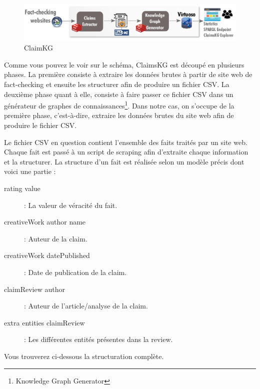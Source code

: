 \documentclass[oneside,13pt,a4paper]{report}
\begin{document}
\begin{figure}[h]
	\centering
	\begin{minipage}[c]{.95\linewidth}
		\includegraphics[width=1\textwidth]{img/claim.png}
		\caption{ClaimKG}
	\end{minipage}
\end{figure}

Comme vous pouvez le voir sur le schéma, ClaimsKG est découpé en plusieurs phases. La première consiste à extraire les données brutes à partir de site web de fact-checking et ensuite les structurer afin de produire un fichier CSV. La deuxième phase quant à elle, consiste à faire passer ce fichier CSV dans un générateur de graphes de connaissances\footnote{Knowledge Graph Generator}. Dans notre cas, on s'occupe de la première phase, c'est-à-dire, extraire les données brutes du site web afin de produire le fichier CSV.

Le fichier CSV en question contient l'ensemble des faits traités par un site web. Chaque fait est passé à un script de scraping afin d'extraite chaque information et la structurer. La structure d'un fait est réalisée selon un modèle précis dont voici une partie :

\begin{description}
	\item[rating value] : La valeur de véracité du fait.
	\item[creativeWork author name] : Auteur de la claim.
	\item[creativeWork datePublished] : Date de publication de la claim.
	\item[claimReview author] : Auteur de l'article/analyse de la claim.
	\item[extra entities claimReview] : Les différentes entités présentes dans la review.
\end{description}

Vous trouverez ci-dessous la structuration complète.
\end{document}
